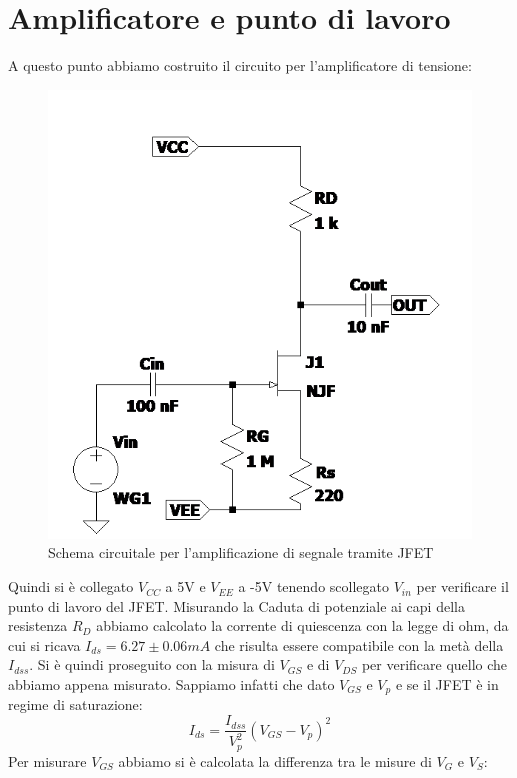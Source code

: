 \documentclass[10pt, a4paper, italian]{article}
\begin{document}
\section{Amplificatore e punto di lavoro}
A questo punto abbiamo costruito il circuito per l'amplificatore di tensione:
\begin{figure}[htbp]
    \centering
	\includegraphics[scale=0.7]{Draft2}
    \caption{Schema circuitale per l'amplificazione di segnale tramite JFET}
\end{figure}
Quindi si è collegato $V_{CC}$ a 5V e $V_{EE}$ a -5V tenendo scollegato $V_{in}$ per verificare il punto di lavoro del JFET.
Misurando la Caduta di potenziale ai capi della resistenza $R_D$ abbiamo calcolato la corrente di quiescenza con la legge di ohm, da cui si ricava $I_{ds}=6.27 \pm 0.06 mA$ che risulta essere compatibile con la metà della $I_{dss}$.
Si è quindi proseguito con la misura di $V_{GS}$ e di $V_{DS}$ per verificare quello che abbiamo appena misurato.
Sappiamo infatti che dato $V_{GS}$ e $V_p$ e se il JFET è in regime di saturazione:
\begin{equation}
I_{ds}=\frac{I_{dss}}{V_p ^2}(V_{GS}-V_p)^2
\end{equation}
Per misurare $V_{GS}$ abbiamo si è calcolata la differenza tra le misure di $V_G$ e $V_S$:
\end{document}
